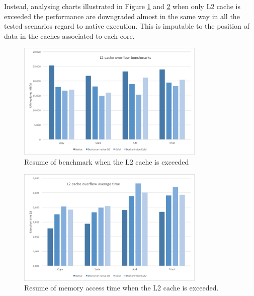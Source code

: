 Instead, analysing charts illustrated in Figure \ref{img:measurements-storage-results-l2Capacity}
and \ref{img:measurements-storage-results-l2Time} when only L2 cache is exceeded the performance are
downgraded almost in the same way in all the tested scenarios regard to native execution. This is
imputable to the position of data in the caches associated to each core.

\begin{figure}
	\centering{}
	\includegraphics[width=0.8\textwidth]{chapters/measurements/images/storage-l2-capacity.png}
	\caption[Storage - overflow L2 cache]{Resume of benchmark when the L2 cache is exceeded}
	\label{img:measurements-storage-results-l2Capacity}
\end{figure}

\begin{figure}
	\centering{}
	\includegraphics[width=0.8\textwidth]{chapters/measurements/images/storage-l2-time.png}
	\caption[Storage - access time L2 cache exceeded]{Resume of memory access time when the L2
		cache is exceeded.}
	\label{img:measurements-storage-results-l2Time}
\end{figure}